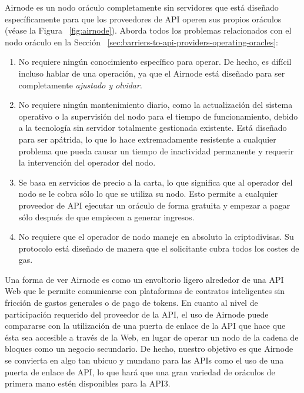 \documentclass[11pt]{article}
\begin{document}
Airnode es un nodo oráculo completamente sin servidores que está diseñado específicamente para que los proveedores de API operen sus propios oráculos (véase la Figura ~\ref{fig:airnode}).
Aborda todos los problemas relacionados con el nodo oráculo en la Sección ~\ref{sec:barriers-to-api-providers-operating-oracles}:

\begin{enumerate}
    \item No requiere ningún conocimiento específico para operar.  De hecho, es difícil incluso hablar de una operación, ya que el Airnode está diseñado para ser completamente \textit{ajustado y olvidar}.
    \item No requiere ningún mantenimiento diario, como la actualización del sistema operativo o la supervisión del nodo para el tiempo de funcionamiento, debido a la tecnología sin servidor totalmente gestionada existente. Está diseñado para ser apátrida, lo que lo hace extremadamente resistente a cualquier problema que pueda causar un tiempo de inactividad permanente y requerir la intervención del operador del nodo.
    \item Se basa en servicios de precio a la carta, lo que significa que al operador del nodo se le cobra sólo lo que se utiliza su nodo. Esto permite a cualquier proveedor de API ejecutar un oráculo de forma gratuita y empezar a pagar sólo después de que empiecen a generar ingresos.
    \item No requiere que el operador de nodo maneje en absoluto la criptodivisas. Su protocolo está diseñado de manera que el solicitante cubra todos los costes de gas.
\end{enumerate}

Una forma de ver Airnode es como un envoltorio ligero alrededor de una API Web que le permite comunicarse con plataformas de contratos inteligentes sin fricción de gastos generales o de pago de tokens. En cuanto al nivel de participación requerido del proveedor de la API, el uso de Airnode puede compararse con la utilización de una puerta de enlace de la API que hace que ésta sea accesible a través de la Web, en lugar de operar un nodo de la cadena de bloques como un negocio secundario. De hecho, nuestro objetivo es que Airnode se convierta en algo tan ubicuo y mundano para las APIs como el uso de una puerta de enlace de API, lo que hará que una gran variedad de oráculos de primera mano estén disponibles para la API3.
\end{document}

